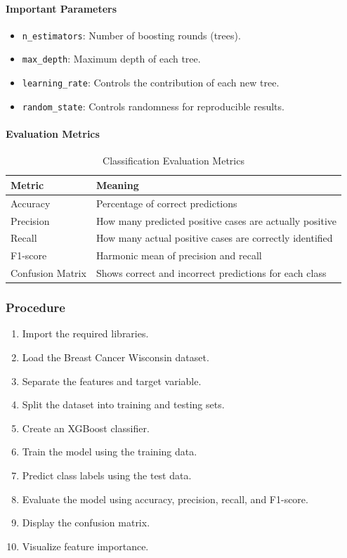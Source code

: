 \documentclass[a4paper,11pt]{article}
\begin{document}
\paragraph{Important Parameters}
\begin{itemize}
    \item \texttt{n\_estimators}: Number of boosting rounds (trees).
    \item \texttt{max\_depth}: Maximum depth of each tree.
    \item \texttt{learning\_rate}: Controls the contribution of each new tree.
    \item \texttt{random\_state}: Controls randomness for reproducible results.
\end{itemize}

\paragraph{Evaluation Metrics}
\begin{table}[H]
\centering
\caption{Classification Evaluation Metrics}
\begin{tabular}{ll}
\toprule
\textbf{Metric} & \textbf{Meaning} \\
\midrule
Accuracy         & Percentage of correct predictions \\
Precision        & How many predicted positive cases are actually positive \\
Recall           & How many actual positive cases are correctly identified \\
F1-score         & Harmonic mean of precision and recall \\
Confusion Matrix & Shows correct and incorrect predictions for each class \\
\bottomrule
\end{tabular}
\end{table}

\subsubsection{Procedure}
\begin{enumerate}
    \item Import the required libraries.
    \item Load the Breast Cancer Wisconsin dataset.
    \item Separate the features and target variable.
    \item Split the dataset into training and testing sets.
    \item Create an XGBoost classifier.
    \item Train the model using the training data.
    \item Predict class labels using the test data.
    \item Evaluate the model using accuracy, precision, recall, and F1-score.
    \item Display the confusion matrix.
    \item Visualize feature importance.
\end{enumerate}
\end{document}
